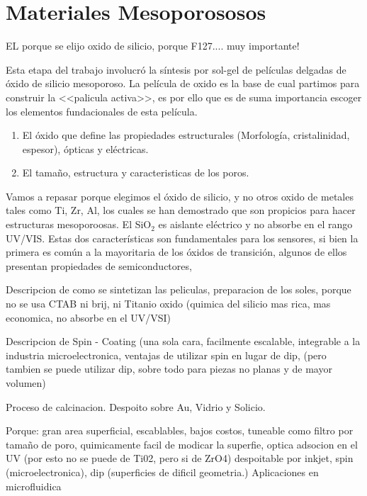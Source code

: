 \section{Materiales Mesoporososos}\label{sec:mesoporosos}

				EL porque se elijo oxido de silicio, porque F127.... muy importante!
				
				Esta etapa del trabajo involucró la síntesis por sol-gel de películas delgadas de óxido de silicio mesoporoso. La película de oxido es la base de cual partimos para construir la <<palicula activa>>, es por ello que es de suma importancia escoger los elementos fundacionales de esta película. \cite{Soler-Illia2002a,Brinker1999,Soler-Illia2006,Grosso2004,Innocenzi2013}


				\begin{enumerate}
					\item El óxido que define las propiedades estructurales (Morfología, cristalinidad, espesor), ópticas y eléctricas.
					\item El tamaño, estructura y caracteristicas de los poros.
				\end{enumerate}

				Vamos a repasar porque elegimos el óxido de silicio, y no otros oxido de metales tales como Ti, Zr, Al, los cuales se han demostrado que son propicios para hacer estructuras mesoporoosas. El SiO$_2$ es aislante eléctrico y no absorbe en el rango UV/VIS. Estas dos características son fundamentales para los sensores, si bien la primera es común a la mayoritaria de los óxidos de transición, algunos de ellos presentan propiedades de semiconductores, 

				Descripcion de como se sintetizan las peliculas, preparacion de los soles, porque no se usa CTAB ni brij, ni Titanio oxido (quimica del silicio mas rica, mas economica, no absorbe en el UV/VSI)

				Descripcion de Spin - Coating (una sola cara, facilmente escalable, integrable a la industria microelectronica, ventajas de utilizar spin en lugar de dip, (pero tambien se puede utilizar dip, sobre todo para piezas no planas y de mayor volumen)

				Proceso de calcinacion. Despoito sobre Au, Vidrio y Solicio.

				Porque: gran area superficial, escablables, bajos costos, tuneable como filtro por tamaño de poro, quimicamente facil de modicar la superfie, optica adsocion en el UV (por esto no se puede de Ti02, pero si de ZrO4) despoitable por inkjet\cite{Lian2013,Mougenot2006a}, spin (microelectronica), dip (superficies de dificil geometria.)
				Aplicaciones en microfluidica \cite{schmuhl2005,Martinez2009}
				

